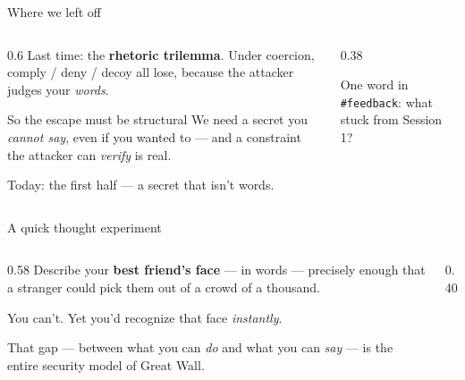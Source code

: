 \documentclass[aspectratio=169,11pt]{beamer}
\begin{document}

\begin{frame}{Where we left off}
  \begin{columns}[T]
    \begin{column}{0.6\textwidth}
      Last time: the \textbf{rhetoric trilemma}. Under coercion, comply / deny /
      decoy all lose, because the attacker judges your \emph{words}.
      \vspace{6pt}
      \begin{block}{So the escape must be structural}
        We need a secret you \emph{cannot say}, even if you wanted to --- and a
        constraint the attacker can \emph{verify} is real.
      \end{block}
      Today: the first half --- a secret that isn't words.
    \end{column}
    \begin{column}{0.38\textwidth}
      \begin{tryit}[Check-in]
        \footnotesize One word in \texttt{\#feedback}: what stuck from Session 1?
      \end{tryit}
    \end{column}
  \end{columns}
\end{frame}

\begin{frame}{A quick thought experiment}
  \begin{columns}[T]
    \begin{column}{0.58\textwidth}
      Describe your \textbf{best friend's face} --- in words --- precisely enough
      that a stranger could pick them out of a crowd of a thousand.
      \vspace{8pt}

      You can't. Yet you'd recognize that face \emph{instantly}.
      \vspace{8pt}

      That gap --- between what you can \emph{do} and what you can \emph{say} ---
      is the entire security model of Great Wall.
    \end{column}
    \begin{column}{0.40\textwidth}
    \end{column}
  \end{columns}
\end{frame}
\end{document}
